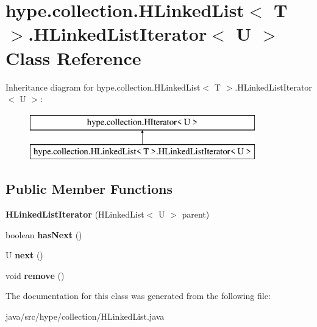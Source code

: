 \hypertarget{classhype_1_1collection_1_1_h_linked_list_3_01_t_01_4_1_1_h_linked_list_iterator_3_01_u_01_4}{\section{hype.\-collection.\-H\-Linked\-List$<$ T $>$.H\-Linked\-List\-Iterator$<$ U $>$ Class Reference}
\label{classhype_1_1collection_1_1_h_linked_list_3_01_t_01_4_1_1_h_linked_list_iterator_3_01_u_01_4}
}
Inheritance diagram for hype.\-collection.\-H\-Linked\-List$<$ T $>$.H\-Linked\-List\-Iterator$<$ U $>$\-:\begin{figure}[H]
\begin{center}
\leavevmode
\includegraphics[height=2.000000cm]{classhype_1_1collection_1_1_h_linked_list_3_01_t_01_4_1_1_h_linked_list_iterator_3_01_u_01_4}
\end{center}
\end{figure}
\subsection*{Public Member Functions}
\begin{DoxyCompactItemize}
\item 
\hypertarget{classhype_1_1collection_1_1_h_linked_list_3_01_t_01_4_1_1_h_linked_list_iterator_3_01_u_01_4_a7969cde34934e788b7b338f46f0438bd}{{\bfseries H\-Linked\-List\-Iterator} (H\-Linked\-List$<$ U $>$ parent)}\label{classhype_1_1collection_1_1_h_linked_list_3_01_t_01_4_1_1_h_linked_list_iterator_3_01_u_01_4_a7969cde34934e788b7b338f46f0438bd}

\item 
\hypertarget{classhype_1_1collection_1_1_h_linked_list_3_01_t_01_4_1_1_h_linked_list_iterator_3_01_u_01_4_a5e330a06da69978e99e267f5bd3c0c07}{boolean {\bfseries has\-Next} ()}\label{classhype_1_1collection_1_1_h_linked_list_3_01_t_01_4_1_1_h_linked_list_iterator_3_01_u_01_4_a5e330a06da69978e99e267f5bd3c0c07}

\item 
\hypertarget{classhype_1_1collection_1_1_h_linked_list_3_01_t_01_4_1_1_h_linked_list_iterator_3_01_u_01_4_a531aac7a316b7c2bfbabe34daa1e964a}{U {\bfseries next} ()}\label{classhype_1_1collection_1_1_h_linked_list_3_01_t_01_4_1_1_h_linked_list_iterator_3_01_u_01_4_a531aac7a316b7c2bfbabe34daa1e964a}

\item 
\hypertarget{classhype_1_1collection_1_1_h_linked_list_3_01_t_01_4_1_1_h_linked_list_iterator_3_01_u_01_4_a4d0ea76115052752ee2a2949a65d0d17}{void {\bfseries remove} ()}\label{classhype_1_1collection_1_1_h_linked_list_3_01_t_01_4_1_1_h_linked_list_iterator_3_01_u_01_4_a4d0ea76115052752ee2a2949a65d0d17}

\end{DoxyCompactItemize}


The documentation for this class was generated from the following file\-:\begin{DoxyCompactItemize}
\item 
java/src/hype/collection/H\-Linked\-List.\-java\end{DoxyCompactItemize}
